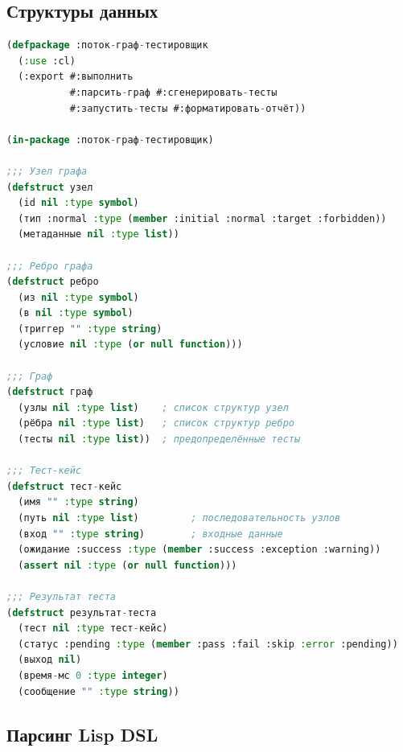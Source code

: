 \documentclass[12pt, a4paper, twoside]{article}
\begin{document}
\subsection{Структуры данных}

\begin{lstlisting}[language=CommonLisp,caption={Базовые структуры данных}]
(defpackage :поток-граф-тестировщик
  (:use :cl)
  (:export #:выполнить
           #:парсить-граф #:сгенерировать-тесты
           #:запустить-тесты #:форматировать-отчёт))

(in-package :поток-граф-тестировщик)

;;; Узел графа
(defstruct узел
  (id nil :type symbol)
  (тип :normal :type (member :initial :normal :target :forbidden))
  (метаданные nil :type list))

;;; Ребро графа
(defstruct ребро
  (из nil :type symbol)
  (в nil :type symbol)
  (триггер "" :type string)
  (условие nil :type (or null function)))

;;; Граф
(defstruct граф
  (узлы nil :type list)    ; список структур узел
  (рёбра nil :type list)   ; список структур ребро
  (тесты nil :type list))  ; предопределённые тесты

;;; Тест-кейс
(defstruct тест-кейс
  (имя "" :type string)
  (путь nil :type list)         ; последовательность узлов
  (вход "" :type string)        ; входные данные
  (ожидание :success :type (member :success :exception :warning))
  (assert nil :type (or null function)))

;;; Результат теста
(defstruct результат-теста
  (тест nil :type тест-кейс)
  (статус :pending :type (member :pass :fail :skip :error :pending))
  (выход nil)
  (время-мс 0 :type integer)
  (сообщение "" :type string))
\end{lstlisting}

\subsection{Парсинг Lisp DSL}
\end{document}
